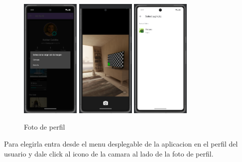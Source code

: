 \documentclass[a4paper,11pt]{report}
\begin{document}
      \begin{figure}[H]
        \centering
        \includegraphics[width=0.25\textwidth]{.img/foto_perfil_1.png}
        \hspace{1cm}
        \includegraphics[width=0.25\textwidth]{.img/foto_perfil_2.png}
        \hspace{1cm}
        \includegraphics[width=0.25\textwidth]{.img/foto_perfil_3.png}
        \caption{Foto de perfil}
        \label{fig:perfil}
      \end{figure}
      Para elegirla entra desde el menu desplegable de la aplicacion en el perfil del usuario y dale click al icono de la camara al lado de la foto de perfil.
\end{document}
